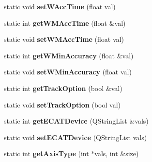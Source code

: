 \begin{DoxyCompactItemize}
\item 
\hypertarget{classRobotConf_a64113a1bff6f584bf5308f75ef1f9793}{static void {\bfseries set\-W\-Acc\-Time} (float val)}\label{classRobotConf_a64113a1bff6f584bf5308f75ef1f9793}

\item 
\hypertarget{classRobotConf_a13a718d45ff7f799807e74aeae439e32}{static int {\bfseries get\-W\-M\-Acc\-Time} (float \&val)}\label{classRobotConf_a13a718d45ff7f799807e74aeae439e32}

\item 
\hypertarget{classRobotConf_a2132ccb1c88c4dea99502d85da77a881}{static void {\bfseries set\-W\-M\-Acc\-Time} (float val)}\label{classRobotConf_a2132ccb1c88c4dea99502d85da77a881}

\item 
\hypertarget{classRobotConf_a12a181e07605a65a2ad5a545c2e407e8}{static int {\bfseries get\-W\-Min\-Accuracy} (float \&val)}\label{classRobotConf_a12a181e07605a65a2ad5a545c2e407e8}

\item 
\hypertarget{classRobotConf_a6f3d4068355eb55b8333d9405632dee9}{static void {\bfseries set\-W\-Min\-Accuracy} (float val)}\label{classRobotConf_a6f3d4068355eb55b8333d9405632dee9}

\item 
\hypertarget{classRobotConf_a6c51e7407022af68fb767b9be8cda207}{static int {\bfseries get\-Track\-Option} (bool \&val)}\label{classRobotConf_a6c51e7407022af68fb767b9be8cda207}

\item 
\hypertarget{classRobotConf_a2f42b320d2c12a5bb05d1f9ca4bab5b7}{static void {\bfseries set\-Track\-Option} (bool val)}\label{classRobotConf_a2f42b320d2c12a5bb05d1f9ca4bab5b7}

\item 
\hypertarget{classRobotConf_a61b1ed14b144174aea028241126b0ee5}{static int {\bfseries get\-E\-C\-A\-T\-Device} (Q\-String\-List \&vals)}\label{classRobotConf_a61b1ed14b144174aea028241126b0ee5}

\item 
\hypertarget{classRobotConf_a343f8374e9eb8627908bea2d5dc48a9f}{static void {\bfseries set\-E\-C\-A\-T\-Device} (Q\-String\-List vals)}\label{classRobotConf_a343f8374e9eb8627908bea2d5dc48a9f}

\item 
\hypertarget{classRobotConf_a883f0049415b7d1c86e7757983517338}{static int {\bfseries get\-Axis\-Type} (int $\ast$vals, int \&size)}\label{classRobotConf_a883f0049415b7d1c86e7757983517338}


\end{DoxyCompactItemize}
